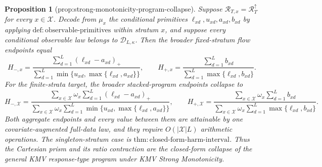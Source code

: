 \documentclass{article}
\newtheorem{proposition}{Proposition}
\begin{document}
\begin{proposition}[prop:strong-monotonicity-program-collapse]\label{prop:strong-monotonicity-program-collapse}
Suppose \(\mathcal R_{T,x}=\mathcal R_T^{\uparrow}\) for every \(x\in\mathcal X\).  Decode from \(\mu_x\) the conditional primitives \(\ell_{xd},u_{xd},a_{xd},b_{xd}\) by applying \(\mathrm{def{:}observable\mbox{-}primitives}\) within stratum \(x\), and suppose every conditional observable law belongs to \(\mathcal D_{L,\kappa}\).  Then the broader fixed-stratum flow endpoints equal
\[H_{-,x}=\frac{\sum_{d=1}^{L}(\ell_{xd}-a_{xd})_+}{\sum_{d=1}^{L}\min\{u_{xd},\max\{\ell_{xd},a_{xd}\}\}},\qquad
H_{+,x}=\frac{\sum_{d=1}^{L}b_{xd}}{\sum_{d=1}^{L}\max\{\ell_{xd},b_{xd}\}}.\]
For the finite-strata target, the broader stacked-program endpoints collapse to
\[H_{-,\mathcal X}=\frac{\sum_{x\in\mathcal X}\omega_x\sum_{d=1}^{L}(\ell_{xd}-a_{xd})_+}{\sum_{x\in\mathcal X}\omega_x\sum_{d=1}^{L}\min\{u_{xd},\max\{\ell_{xd},a_{xd}\}\}},\qquad
H_{+,\mathcal X}=\frac{\sum_{x\in\mathcal X}\omega_x\sum_{d=1}^{L}b_{xd}}{\sum_{x\in\mathcal X}\omega_x\sum_{d=1}^{L}\max\{\ell_{xd},b_{xd}\}}.\]
Both aggregate endpoints and every value between them are attainable by one covariate-augmented full-data law, and they require \(O(|\mathcal X|L)\) arithmetic operations.  The singleton-stratum case is \(\mathrm{thm{:}closed\mbox{-}form\mbox{-}harm\mbox{-}interval}\).  Thus the Cartesian prism and its ratio contraction are the closed-form collapse of the general KMV response-type program under KMV Strong Monotonicity.
\end{proposition}
\end{document}
